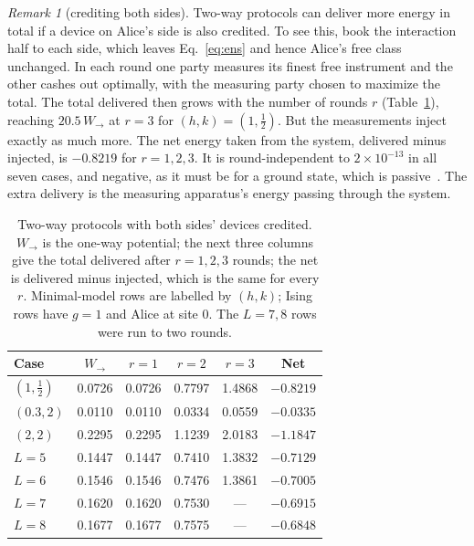 \documentclass[aps,pra,twocolumn,reprint,superscriptaddress,nofootinbib,floatfix]{revtex4-2}
\theoremstyle{plain}
\theoremstyle{remark}
\newtheorem{remark}{Remark}
\newcommand{\Wto}{W_{\to}}
\begin{document}
\begin{remark}[crediting both sides]
Two-way protocols can deliver more energy in total if a device on Alice's side is also
credited. To see this, book the interaction half to each side, which leaves
Eq.~\eqref{eq:ens} and hence Alice's free class unchanged. In each round one party measures
its finest free instrument and the other cashes out optimally, with the measuring party
chosen to maximize the total. The total delivered
then grows with the number of rounds $r$ (Table~\ref{tab:twoway}), reaching $20.5\,\Wto$ at
$r=3$ for $(h,k)=(1,\tfrac12)$. But the measurements inject exactly as much more. The net
energy taken from the system, delivered minus injected, is $-0.8219$ for $r=1,2,3$. It is
round-independent to $2\times10^{-13}$ in all seven cases, and negative, as it must be for a
ground state, which is passive~\cite{PuszWoronowicz1978}. The extra delivery is the measuring
apparatus's energy passing through the system.
\end{remark}

\begin{table}[t]
\caption{Two-way protocols with both sides' devices credited. $\Wto$ is the one-way
potential; the next three columns give the total delivered after $r=1,2,3$ rounds; the net
is delivered minus injected, which is the same for every $r$. Minimal-model rows are labelled
by $(h,k)$; Ising rows have $g=1$ and Alice at site 0. The $L=7,8$ rows were run to two
rounds.}
\label{tab:twoway}
\begin{ruledtabular}
\begin{tabular}{lccccc}
Case & $\Wto$ & $r=1$ & $r=2$ & $r=3$ & Net\\
\hline
$(1,\tfrac12)$ & 0.0726 & 0.0726 & 0.7797 & 1.4868 & $-0.8219$\\
$(0.3,2)$ & 0.0110 & 0.0110 & 0.0334 & 0.0559 & $-0.0335$\\
$(2,2)$ & 0.2295 & 0.2295 & 1.1239 & 2.0183 & $-1.1847$\\
$L=5$ & 0.1447 & 0.1447 & 0.7410 & 1.3832 & $-0.7129$\\
$L=6$ & 0.1546 & 0.1546 & 0.7476 & 1.3861 & $-0.7005$\\
$L=7$ & 0.1620 & 0.1620 & 0.7530 & --- & $-0.6915$\\
$L=8$ & 0.1677 & 0.1677 & 0.7575 & --- & $-0.6848$\\
\end{tabular}
\end{ruledtabular}
\end{table}
\end{document}
